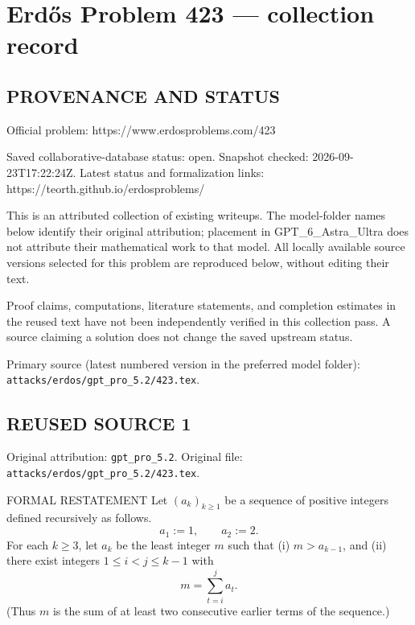 \section*{Erd\H{o}s Problem 423 --- collection record}

\subsection*{PROVENANCE AND STATUS}
Official problem: https://www.erdosproblems.com/423

Saved collaborative-database status: open.
Snapshot checked: 2026-09-23T17:22:24Z.
Latest status and formalization links: https://teorth.github.io/erdosproblems/

This is an attributed collection of existing writeups. The model-folder names below identify their original attribution; placement in GPT\_6\_Astra\_Ultra does not attribute their mathematical work to that model. All locally available source versions selected for this problem are reproduced below, without editing their text.

Proof claims, computations, literature statements, and completion estimates in the reused text have not been independently verified in this collection pass. A source claiming a solution does not change the saved upstream status.

Primary source (latest numbered version in the preferred model folder): \texttt{attacks/erdos/gpt\_pro\_5.2/423.tex}.

\subsection*{REUSED SOURCE 1}
Original attribution: \texttt{gpt\_pro\_5.2}.
Original file: \texttt{attacks/erdos/gpt\_pro\_5.2/423.tex}.


FORMAL RESTATEMENT
Let $(a_k)_{k\ge 1}$ be a sequence of positive integers defined recursively as follows.
\[
 a_1:=1,\qquad a_2:=2.
\]
For each $k\ge 3$, let $a_k$ be the least integer $m$ such that
(i) $m>a_{k-1}$, and
(ii) there exist integers $1\le i<j\le k-1$ with
\[
 m=\sum_{t=i}^j a_t.
\]
(Thus $m$ is the sum of at least two consecutive earlier terms of the sequence.)

